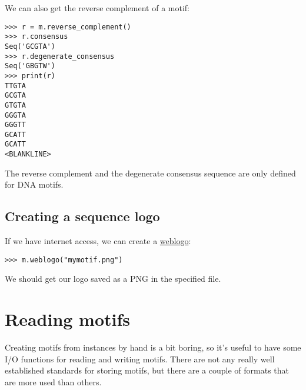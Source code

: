 We can also get the reverse complement of a motif:
\begin{verbatim}
>>> r = m.reverse_complement()
>>> r.consensus
Seq('GCGTA')
>>> r.degenerate_consensus
Seq('GBGTW')
>>> print(r)
TTGTA
GCGTA
GTGTA
GGGTA
GGGTT
GCATT
GCATT
<BLANKLINE>
\end{verbatim}

The reverse complement and the degenerate consensus sequence are
only defined for DNA motifs.

\subsection{Creating a sequence logo}
If we have internet access, we can create a \href{https://weblogo.berkeley.edu}{weblogo}:
\begin{verbatim}
>>> m.weblogo("mymotif.png")
\end{verbatim}
We should get our logo saved as a PNG in the specified file.

\section{Reading motifs}
\label{sec:io}

Creating motifs from instances by hand is a bit boring, so it's
useful to have some I/O functions for reading and writing
motifs. There are not any really well established standards for storing
motifs, but there are a couple of formats that are more used than
others.

